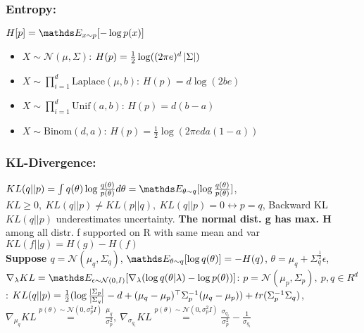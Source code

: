 \subsubsection{Entropy:}
$H[p] = \E[x \sim p]{-\log p(x)}$
\begin{itemize}
    \item $X \sim \mathcal{N}(\mu, \Sigma)$: $H(p)=\frac{1}{2} \log ((2\pi e)^{d} \left\lvert\Sigma\right\rvert)$
    \item $X \sim \prod_{i=1}^{d} \text{Laplace}(\mu, b)$: $H(p)=d \log (2be)$
    \item $X \sim \prod_{i=1}^{d} \text{Unif}(a, b)$: $H(p)=d(b-a)$
    \item $X \sim \text{Binom}(d, a)$: $H(p)=\frac{1}{2} \log (2\pi ed a (1-a)) $
\end{itemize}

\subsubsection{KL-Divergence:}
$KL(q||p) = \int q(\theta) \log \frac{q(\theta)}{p(\theta)}d\theta = \E[\theta \sim q]{\log \frac{q(\theta)}{p(\theta)}}$,
$KL \geq 0,\ KL(q||p) \neq KL(p||q),\ KL(q||p) = 0 \leftrightarrow p=q$,
Backward KL $KL(q||p)$ underestimates uncertainty.
\textbf{The normal dist. g has max. H} among all distr. f supported on R with same mean and var
$KL(f||g) = H(g)-H(f)$\\

\textbf{Suppose $q = \mathcal{N}(\mu_{q}, \Sigma_{q})$},
$\E[\theta \sim q]{\log q(\theta)} = -H(q)$, $\theta = \mu_{q} + \Sigma_{q}^{\frac{1}{2}}\epsilon$,
$\nabla_{\lambda} KL = \E[\epsilon \sim \mathcal{N}(0,I)]{\nabla_{\lambda} (\log q(\theta| \lambda) - \log p(\theta))}$:
$p=\mathcal{N}(\mu_{p}, \Sigma_{p}),\ p,q \in R^{d}$: $KL(q||p) = \frac{1}{2}(\log \frac{\left\lvert\Sigma_{p}\right\rvert}{\left\lvert\Sigma_{q}\right\rvert} -d +
        (\mu_{q}-\mu_{p})^{\top}\Sigma_{p}^{-1}(\mu_{q}-\mu_{p})) + tr(\Sigma_{p}^{-1} \Sigma_{q})$,
    $\nabla_{\mu_{q}}KL \overset{p(\theta) \sim \mathcal{N}(0, \sigma_{p}^{2}I)}{=} \frac{\mu_{q}}{\sigma_{p}^{2}},\
        \nabla_{\sigma_{q_{i}}}KL \overset{p(\theta) \sim \mathcal{N}(0, \sigma_{p}^{2}I)}{=} \frac{\sigma_{q_{i}}}{\sigma_{p}^{2}}-
        \frac{1}{\sigma_{q_{i}}}$


